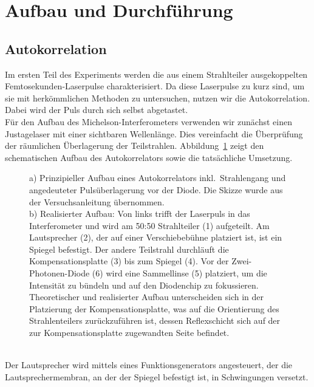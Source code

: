 \section{\label{sec:aufbau}Aufbau und Durchführung}
\subsection{Autokorrelation}
Im ersten Teil des Experiments werden die aus einem Strahlteiler ausgekoppelten Femtosekunden-Laserpulse 
charakterisiert. Da diese Laserpulse zu kurz sind, um sie mit herkömmlichen Methoden zu untersuchen, 
nutzen wir die Autokorrelation. Dabei wird der Puls durch sich selbst abgetastet. \\
Für den Aufbau des Michelson-Interferometers verwenden wir zunächst einen Justagelaser mit einer 
sichtbaren Wellenlänge. Dies vereinfacht die Überprüfung der räumlichen Überlagerung der Teilstrahlen. 
Abbildung~\ref{fig:autokorr} zeigt den schematischen Aufbau des Autokorrelators sowie die tatsächliche Umsetzung.
\begin{figure}[h!]
    \centering
    \qquad
    \caption{\label{fig:autokorr}a) Prinzipieller Aufbau eines Autokorrelators inkl.~Strahlengang und angedeuteter Pulsüberlagerung
    vor der Diode. Die Skizze wurde aus der Versuchsanleitung \cite{Anleitung} übernommen. \\
    b) Realisierter Aufbau: Von links trifft der Laserpuls in das Interferometer und wird am 50:50 Strahlteiler (1) aufgeteilt. 
    Am Lautsprecher (2), der auf einer Verschiebebühne platziert ist, ist ein Spiegel befestigt. Der andere Teilstrahl durchläuft die 
    Kompensationsplatte (3) bis zum Spiegel (4). Vor der Zwei-Photonen-Diode (6) wird 
    eine Sammellinse (5) platziert, um die Intensität zu bündeln und auf den Diodenchip zu fokussieren. \\
    Theoretischer und realisierter Aufbau unterscheiden sich in der Platzierung der Kompensationsplatte, was 
    auf die Orientierung des Strahlenteilers zurückzuführen ist, dessen Reflexschicht sich auf der zur 
    Kompensationsplatte zugewandten Seite befindet.}
\end{figure}\FloatBarrier \,\\
Der Lautsprecher wird mittels eines Funktionsgenerators angesteuert, der die Lautsprechermembran, 
an der der Spiegel befestigt ist, in Schwingungen versetzt. 
